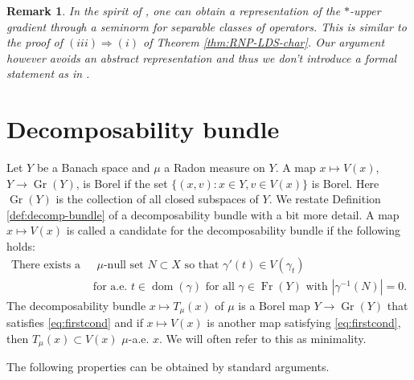 \documentclass{amsart}
\newtheorem{remark}[theorem]{Remark}
\numberwithin{equation}{section}
\newcommand{\dom}{\operatorname{dom}}
\newcommand{\Fr}{\operatorname{Fr}}
\newcommand{\inv}{^{-1}}
\begin{document}
\begin{remark}\label{rmk:ugscalarized}
In the spirit of \cite[Proposition 4.5]{tsd24}, one can obtain a representation of the $*$-upper gradient through a seminorm for separable classes of operators. This is similar to the proof of $(iii)\Rightarrow(i)$ of Theorem \ref{thm:RNP-LDS-char}. Our argument however avoids an abstract representation and thus we don't introduce a formal statement as in \cite{tsd24}.
\end{remark}


\section{Decomposability bundle}\label{sec:decomp-bundle}

Let $Y$ be a Banach space and $\mu$ a Radon measure on $Y$. A map $x\mapsto V(x)$, $Y\to \operatorname{Gr}(Y)$, is Borel if the set $\{(x,v) : x\in Y, v\in V(x)\}$ is Borel. Here $\operatorname{Gr}(Y)$ is the collection of all closed subspaces of $Y$. We restate Definition \ref{def:decomp-bundle} of a decomposability bundle with a bit more detail. A map $x\mapsto V(x)$ is called a candidate for the decomposability bundle if the following holds:
\begin{align}\label{eq:firstcond}
    \text{There exists a} &\text{  $\mu$-null set $N\subset X$ so that $\gamma'(t)\in V(\gamma_t)$} \\
    &\text{ for a.e. $t\in \dom(\gamma)$ for all $\gamma\in\Fr(Y)$ with $|\gamma\inv(N)|=0$.} \nonumber
\end{align}
The decomposability bundle $x\mapsto T_\mu(x)$ of $\mu$ is a Borel map $Y\to \operatorname{Gr}(Y)$ that satisfies \eqref{eq:firstcond} and if $x\mapsto V(x)$ is another map satisfying \eqref{eq:firstcond}, then $T_\mu(x)\subset V(x)$ $\mu$-a.e.  $x$. We will often refer to this as minimality.

The following properties can be obtained by standard arguments.
\end{document}
